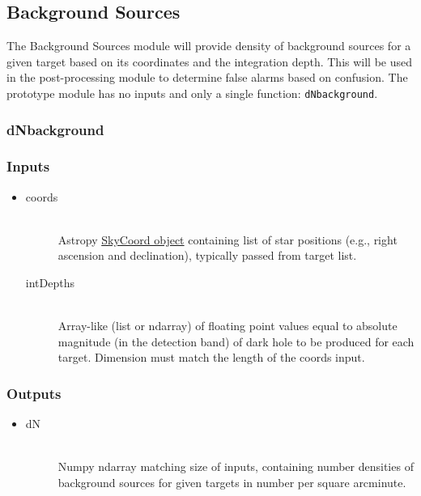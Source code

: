 \documentclass[cleanfoot]{asme2ej}
\begin{document}
\subsection{Background Sources}\label{sec:backgroundsources}

The Background Sources module will provide density of background sources for a given target based on its coordinates and the integration depth.  This will be used in the post-processing module to determine false alarms based on confusion.  The prototype module has no inputs and only a single function: \verb+dNbackground+.

\subsubsection{dNbackground}
\subsubsection*{Inputs}
\begin{itemize}
    \item 
    \begin{description}
        \item[coords] \hfill \\
        Astropy \href{http://astropy.readthedocs.org/en/latest/api/astropy.coordinates.SkyCoord.html}{SkyCoord object} containing list of star positions (e.g., right ascension and declination), typically passed from target list.
        \item[intDepths] \hfill \\
        Array-like (list or ndarray) of floating point values equal to absolute magnitude (in the detection band) of dark hole to be produced for each target. Dimension must match the length of the coords input.
    \end{description}
\end{itemize}

\subsubsection*{Outputs}
\begin{itemize}
    \item 
    \begin{description}
        \item[dN] \hfill \\
        Numpy ndarray matching size of inputs, containing number densities of background sources for given targets in number per square arcminute.
    \end{description}
\end{itemize}
\end{document}
